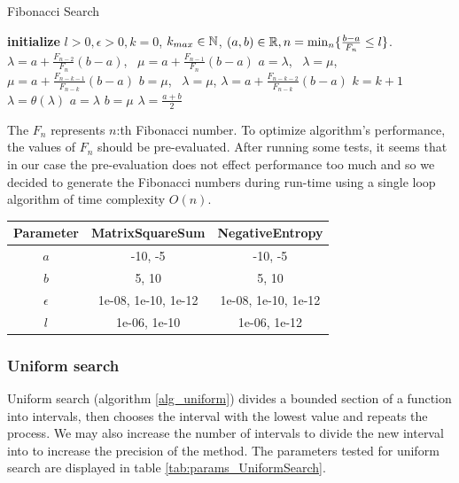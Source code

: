 \documentclass[english, 12pt, a4paper, sci, utf8, a-1b, online, table]{aaltothesis}
\newcommand{\R}{\ensuremath\mathbb{R}}
\newcommand{\N}{\ensuremath\mathbb{N}}
\begin{document}
\begin{algorithm}[H]
\caption{Fibonacci Search}
\label{alg_fibonacci}
\begin{algorithmic}[1]
\STATE \textbf{initialize} $l > 0, \epsilon > 0, k = 0$, $k_{max} \in \N$, $(a, b) \in \R, n = \mathrm{min}_n \{ \frac{b - a}{F_n} \leq l \}$.
\STATE $\lambda = a + \frac{F_{n-2}}{F_n} (b - a)$, \  $\mu = a + \frac{F_{n-1}}{F_n} (b - a)$
    \IF{$\theta(\lambda) < \theta(\mu)$}
        \STATE $a = \lambda$, \ $\lambda = \mu$, $\mu = a + \frac{F_{n-k-1}}{F_{n-k}} (b - a)$
    \ELSE
        \STATE $b = \mu$, \ $\lambda = \mu$, $\lambda = a + \frac{F_{n-k-2}}{F_{n-k}} (b - a)$
    \ENDIF
    \STATE $k = k + 1$
\ENDWHILE
\STATE $\lambda = \theta(\lambda)$
\IF{$\theta(\lambda) > \theta(\mu + \epsilon)$}
    \STATE $a = \lambda$
\ELSE
    \STATE $b = \mu$
\ENDIF
\RETURN $\lambda = \frac{a + b}{2}$
\end{algorithmic}
\end{algorithm}

The $F_n$ represents $n$:th Fibonacci number. To optimize algorithm's performance, the values of $F_n$ should be pre-evaluated. After running some tests, it seems that in our case the pre-evaluation does not effect performance too much and so we decided to generate the Fibonacci numbers during run-time using a single loop algorithm of time complexity $O(n)$.

\begin{table}[H]
\label{tab:params_FibonacciSearch}
\centering
{}
\begin{tabular}{|c|c|c|}
\hline
\rowcolor{gray!25}
Parameter & MatrixSquareSum & NegativeEntropy \\
\hline
$a$ & -10, -5 & -10, -5 \\
$b$ & 5, 10 & 5, 10 \\
$\epsilon$ & 1e-08, 1e-10, 1e-12 & 1e-08, 1e-10, 1e-12 \\
$l$ & 1e-06, 1e-10 & 1e-06, 1e-12 \\
\hline
\end{tabular}
\end{table}


\subsubsection{Uniform search}


Uniform search (algorithm \ref{alg_uniform}) divides a bounded section of a function into intervals, then chooses the interval with the lowest value and repeats the process. We may also increase the number of intervals to divide the new interval into to increase the precision of the method. The parameters tested for uniform search are displayed in table \ref{tab:params_UniformSearch}. \cite{book:nonlinear_programming}
\end{document}
